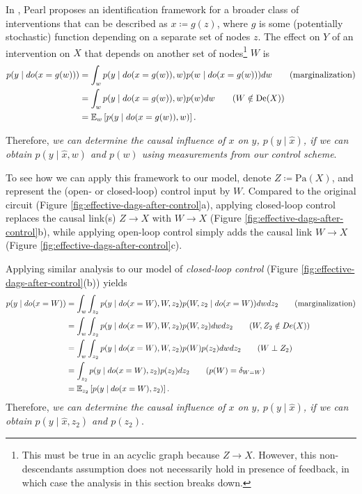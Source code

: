In \cite[Ch.~4.2]{pearl2009causality}, Pearl proposes an identification framework for a broader class of interventions that can be described as $x \coloneqq g(z)$, where $g$ is some (potentially stochastic) function depending on a separate set of nodes $z$. The effect on $Y$ of an intervention on $X$ that depends on another set of nodes\footnote{This must be true in an acyclic graph because $Z \to X$. However, this non-descendants assumption does not necessarily hold in presence of feedback, in which case the analysis in this section breaks down.} $W$ is
\begin{align}
    p(y \mid do(x=g(w))) &= \int_w p(y \mid do(x=g(w)), w) p(w \mid do(x=g(w))) dw \qquad \text{(marginalization)} \\
    &= \int_w p(y \mid do(x=g(w)), w) p(w) dw \qquad \text{($W \notin \mathrm{De}(X)$)} \\
    &= \mathbb{E}_{w} \left[ p(y \mid do(x=g(w)), w) \right].
\end{align}

Therefore, \emph{we can determine the causal influence of $x$ on $y$, $p(y \mid \widehat{x})$, if we can obtain $p(y \mid \widehat{x}, w)$ and $p(w)$ using measurements from our control scheme}.

To see how we can apply this framework to our model, denote $Z \coloneqq \mathrm{Pa}(X)$, and represent the (open- or closed-loop) control input by $W$. Compared to the original circuit (Figure \ref{fig:effective-dags-after-control}a), applying closed-loop control replaces the causal link(s) $Z \to X$ with $W \to X$ (Figure \ref{fig:effective-dags-after-control}b), while applying open-loop control simply adds the causal link $W \to X$ (Figure \ref{fig:effective-dags-after-control}c).

Applying similar analysis to our model of \emph{closed-loop control} (Figure \ref{fig:effective-dags-after-control}(b)) yields
\begin{align}
    p(y \mid do(x = W)) &= \int_w \int_{z_2} p(y \mid do(x = W), W, z_2) p(W, z_2 \mid do(x = W)) dw dz_2 \qquad \text{(marginalization)} \\
    &= \int_w \int_{z_2} p(y \mid do(x=W), W, z_2) p(W,z_2) dw dz_2 \qquad \text{($W,Z_2 \notin De(X)$)} \\
    &= \int_w \int_{z_2} p(y \mid do(x=W), W, z_2) p(W) p(z_2) dw dz_2 \qquad \text{($W \perp Z_2$)} \\
    &= \int_{z_2} p(y \mid do(x=W), z_2) p(z_2) dz_2 \qquad \text{($p(W) = \delta_{W=W}$)} \\
    &= \mathbb{E}_{z_2} \left[ p(y \mid do(x=W), z_2) \right].
\end{align}
Therefore, \emph{we can determine the causal influence of $x$ on $y$, $p(y \mid \widehat{x})$, if we can obtain $p(y \mid \widehat{x}, z_2)$ and $p(z_2)$}.

